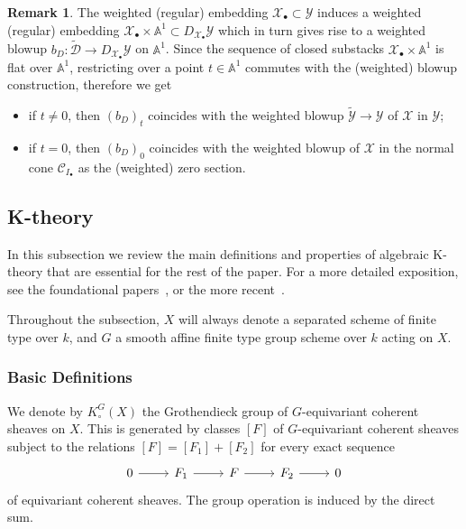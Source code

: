 \documentclass[12pt]{amsart}
\newcommand\A{\mathbb{A}}
\newcommand{\bA}{\mathbb{A}}
\newcommand{\cC}{\mathcal{C}}
\newcommand{\cD}{\mathcal{D}}
\newcommand{\cX}{\mathcal{X}}
\newcommand{\cY}{\mathcal{Y}}
\newcommand{\Kgroup}{K_{\circ}}
\theoremstyle{definition}
\newtheorem{Rmk}[theorem]{Remark}
\begin{document}
\begin{Rmk}\label{rem:blowup-of-def-cone}
    The weighted (regular) embedding $\cX_{\bullet} \subset \cY$ induces a weighted (regular) embedding $\cX_{\bullet} \times \A^1 \subset D_{\cX_{\bullet}}\cY$ which in turn gives rise to a weighted blowup $b_D: \widetilde{\cD} \rightarrow D_{\cX_{\bullet}}\cY$ on $\bA^1$. Since the sequence of closed substacks $\cX_{\bullet} \times \A^1$ is flat over $\A^1$, restricting over a point $t \in \A^1$ commutes with the (weighted) blowup construction, therefore we get 
    \begin{itemize}
        \item if $t\neq 0$, then $(b_D)_t$ coincides with the weighted blowup $\widetilde{\cY} \rightarrow \cY$ of $\cX$ in $\cY$;
        \item if $t=0$, then $(b_D)_0$ coincides with the weighted blowup of $\cX$ in the normal cone $\cC_{I_{\bullet}}$ as the (weighted) zero section. 
    \end{itemize}
\end{Rmk}
\subsection{K-theory}\label{sub:basics-K-theory}

In this subsection we review the main definitions and properties of algebraic K-theory that are essential for the rest of the paper. For a more detailed exposition, see the foundational papers~\cite{Thomason-LefschetzRR,Thomason-equivariantKtheory,Thomason-blowup}, or the more recent~\cite{Merkurjev-equivariantKtheory,AndersonPayne-OperationalKtheory}.

Throughout the subsection, $X$ will always denote a separated scheme of finite type over $k$, and $G$ a smooth affine finite type group scheme over $k$ acting on $X$.

\subsubsection{Basic Definitions}\label{sec: basic-def-K-theory}

We denote by $\Kgroup^G(X)$ the Grothendieck group of $G$-equivariant coherent sheaves on $X$. This is generated by classes $[F]$ of $G$-equivariant coherent sheaves subject to the relations $[F]=[F_1]+[F_2]$ for every exact sequence
\[
\begin{tikzcd}
    0\arrow[r] & F_1\arrow[r] & F\arrow[r] & F_2\arrow[r] & 0
\end{tikzcd}
\]
of equivariant coherent sheaves. The group operation is induced by the direct sum.
\end{document}
